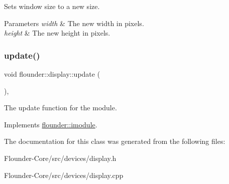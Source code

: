 Sets window size to a new size. 


\begin{DoxyParams}{Parameters}
{\em width} & The new width in pixels. \\
\hline
{\em height} & The new height in pixels. \\
\hline
\end{DoxyParams}
\mbox{\label{classflounder_1_1display_a799c6a76fcac1a0ca56dfd6b8d7993fa}} 
\subsubsection{\texorpdfstring{update()}{update()}}
{\footnotesize\ttfamily void flounder\+::display\+::update (\begin{DoxyParamCaption}{ }\end{DoxyParamCaption})\hspace{0.3cm}{\ttfamily [override]}, {\ttfamily [virtual]}}



The update function for the module. 



Implements \hyperlink{classflounder_1_1imodule_a9a53d48a46b5f6b16a92b2cd8503f74a}{flounder\+::imodule}.



The documentation for this class was generated from the following files\+:\begin{DoxyCompactItemize}
\item 
Flounder-\/\+Core/src/devices/display.\+h\item 
Flounder-\/\+Core/src/devices/display.\+cpp\end{DoxyCompactItemize}
